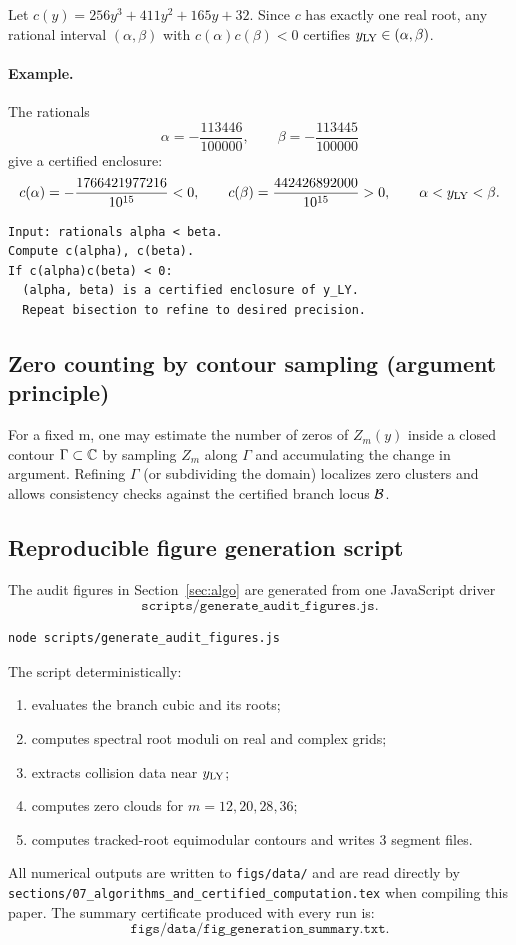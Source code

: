 Let \(c(y)=256y^3+411y^2+165y+32\). Since \(c\) has exactly one real root, any rational interval \((\alpha,\beta)\) with
\(c(\alpha)c(\beta)<0\) certifies \(y_{\mathrm{LY}}\in(\alpha,\beta)\).

\paragraph{Example.}
The rationals
\[
\alpha=-\frac{113446}{100000},\qquad \beta=-\frac{113445}{100000}
\]
give a certified enclosure:
\[
c(\alpha)=-\frac{1766421977216}{10^{15}}<0,\qquad
c(\beta)=\frac{442426892000}{10^{15}}>0,\qquad
\alpha<y_{\mathrm{LY}}<\beta.
\]

\begin{verbatim}
Input: rationals alpha < beta.
Compute c(alpha), c(beta).
If c(alpha)c(beta) < 0:
  (alpha, beta) is a certified enclosure of y_LY.
  Repeat bisection to refine to desired precision.
\end{verbatim}

\subsection{Zero counting by contour sampling (argument principle)}

For a fixed m, one may estimate the number of zeros of \(Z_m(y)\) inside a closed contour \(\Gamma\subset\mathbb{C}\) by sampling \(Z_m\) along \(\Gamma\) and accumulating the change in argument.
Refining \(\Gamma\) (or subdividing the domain) localizes zero clusters and allows consistency checks against the certified branch locus \(\mathcal{B}\).

\subsection{Reproducible figure generation script}

The audit figures in Section~\ref{sec:algo} are generated from one JavaScript driver
\[
\texttt{scripts/generate\_audit\_figures.js}.
\]
\begin{verbatim}
node scripts/generate_audit_figures.js
\end{verbatim}

The script deterministically:
\begin{enumerate}
  \item evaluates the branch cubic and its roots;
  \item computes spectral root moduli on real and complex grids;
  \item extracts collision data near \(y_{\mathrm{LY}}\);
  \item computes zero clouds for \(m=12,20,28,36\);
  \item computes tracked-root equimodular contours and writes 3 segment files.
\end{enumerate}

All numerical outputs are written to \texttt{figs/data/} and are read directly by
\texttt{sections/07\_algorithms\_and\_certified\_computation.tex} when compiling this paper.
The summary certificate produced with every run is:
\[
\texttt{figs/data/fig\_generation\_summary.txt}.
\]


